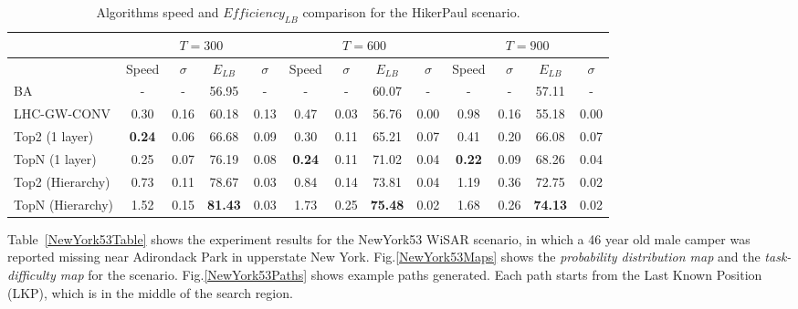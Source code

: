 \begin{center}
\begin{table*}[hbtp]
{
\scriptsize
\hfill{}
\setlength{\extrarowheight}{1.5pt}
\begin{tabular}
{|l|c|c|c|c|c|c|c|c|c|c|c|c|}
\hline
& \multicolumn{4}{|c|}{$T=300$} & \multicolumn{4}{|c|}{$T=600$} & \multicolumn{4}{|c|}{$T=900$} \\ 
\hline
& Speed & $\sigma$ & $\mathit{E_{LB}}$ & $\sigma$ & Speed & $\sigma$ & $\mathit{E_{LB}}$ & $\sigma$ & Speed & $\sigma$ & $\mathit{E_{LB}}$ & $\sigma$\\ 
\hline
BA & - & - & 56.95 & - & - & - & 60.07 & - & - & - & 57.11 & - \\ 
\hline
LHC-GW-CONV & 0.30 & 0.16 & 60.18 & 0.13 & 0.47 & 0.03 & 56.76 & 0.00 & 0.98 & 0.16 & 55.18 & 0.00\\ 
\hline
Top2 (1 layer) & \textbf{0.24} & 0.06 & 66.68 & 0.09 & 0.30 & 0.11 & 65.21 & 0.07 & 0.41 & 0.20 & 66.08 & 0.07\\ 
\hline
TopN (1 layer) & 0.25 & 0.07 & 76.19 & 0.08 & \textbf{0.24} & 0.11 & 71.02 & 0.04 & \textbf{0.22} & 0.09 & 68.26 & 0.04\\ 
\hline
Top2 (Hierarchy) & 0.73 & 0.11 & 78.67 & 0.03 & 0.84 & 0.14 & 73.81 & 0.04 & 1.19 & 0.36 & 72.75 & 0.02\\ 
\hline
TopN (Hierarchy) & 1.52 & 0.15 & \textbf{81.43} & 0.03 & 1.73 & 0.25 & \textbf{75.48} & 0.02 & 1.68 & 0.26 & \textbf{74.13} & 0.02\\ 
\hline
\end{tabular}}
\medskip
\caption{Algorithms speed and $\mathit{Efficiency_{LB}}$ comparison for the HikerPaul scenario.}
\label{HikerPaulTable}
\vspace*{-2ex}
\end{table*}
\end{center}


Table~\ref{NewYork53Table} shows the experiment results for the NewYork53 WiSAR scenario, in which a 46 year old male camper was reported missing near Adirondack Park in upperstate New York. Fig.\ref{NewYork53Maps} shows the \textit{probability distribution map} and the \textit{task-difficulty map} for the scenario. Fig.\ref{NewYork53Paths} shows example paths generated. Each path starts from the Last Known Position (LKP), which is in the middle of the search region.

